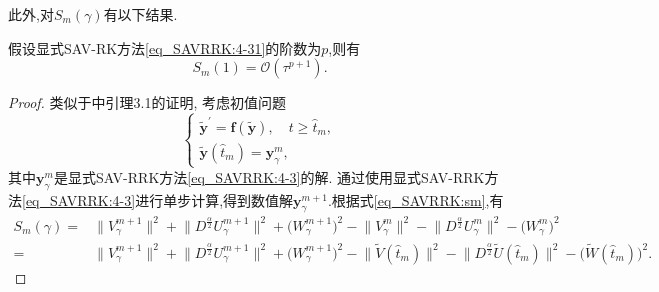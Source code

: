 此外,对$S_m(\gamma)$有以下结果.
\begin{lemma}\label{lem_SAVRRK:5_1}
假设显式SAV-RK方法\eqref{eq_SAVRRK:4-31}的阶数为$p$,则有
\begin{equation}
S_m(1)=\mathcal{O}(\tau^{p+1}).
\end{equation}
\end{lemma}

\begin{proof}
类似于\cite{liImplicitexplicitRelaxationRungeKutta2022}中引理3.1的证明,
考虑初值问题
\begin{equation}
\left\{\begin{array}{l}
\tilde{\bm{y}}^{\prime}=\bm{f}(\tilde{\bm{y}}), \quad t \geq \hat{t}_m, \\
\tilde{\bm{y}}\left(\hat{t}_m\right)=\bm{y}_\gamma^m,
\end{array}\right.
\end{equation}
其中$\bm{y}_\gamma^m$是显式SAV-RRK方法\eqref{eq_SAVRRK:4-3}的解.
通过使用显式SAV-RRK方法\eqref{eq_SAVRRK:4-3}进行单步计算,得到数值解$\bm{y}_\gamma^{m+1}$.根据式\eqref{eq_SAVRRK:sm},有
\begin{equation}
\begin{aligned}
S_m(\gamma) \!=& \|V_\gamma^{m+1}\|^2 \!+\! \|D^\frac{\alpha}{2} U_\gamma^{m+1}\|^2\!+\!\big(W_\gamma^{m+1}\big)^2\!-\!\|V_\gamma^{m}\|^2 \!-\! \|D^\frac{\alpha}{2} U_\gamma^{m}\|^2\!-\!\big(W_\gamma^{m}\big)^2\\
\!=& \|V_\gamma^{m+1}\|^2 \!+\! \|D^\frac{\alpha}{2} U_\gamma^{m+1}\|^2\!+\!\big(W_\gamma^{m+1}\big)^2\!-\!\|\tilde{V}(\hat{t}_{m})\|^2 \!-\! \|D^\frac{\alpha}{2} \tilde{U}(\hat{t}_{m})\|^2\!-\!\big(\tilde{W}(\hat{t}_{m})\big)^2.
\end{aligned}
\end{equation}


\end{proof}
